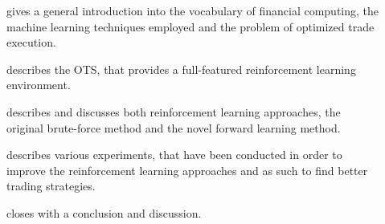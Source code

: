 \begin{description}
\item[] gives a general introduction into the vocabulary of financial computing, the machine learning techniques employed and the problem of optimized trade execution.
\item[] describes the \acl{OTS}, that provides a full-featured reinforcement learning environment.
\item[] describes and discusses both reinforcement learning approaches, \ie the original brute-force method and the novel forward learning method.
\item[] describes various experiments, that have been conducted in order to improve the reinforcement learning approaches and as such to find better trading strategies.
\item[] closes with a conclusion and discussion. 

\end{description}


\cleardoublepage{}